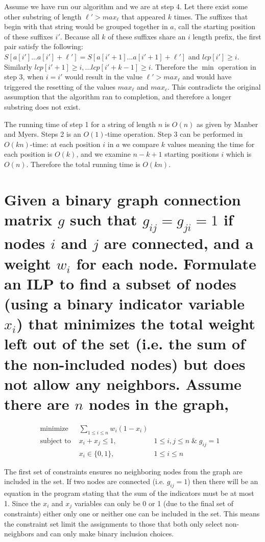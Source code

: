 \documentclass[11pt, oneside]{article}   	%
\begin{document}
Assume we have run our algorithm and we are at step 4. 
Let there exist some other substring of length $\ell'>max_\ell$ that appeared $k$ times.
The suffixes that begin with that string would be grouped together in $a$, call the starting position of these suffixes $i'$. 
Because all $k$ of these suffixes share an $i$ length prefix, the first pair satisfy the following: $S[a[i']...a[i']+\ell'] = S[a[i'+1]...a[i'+1]+\ell']$ and $lcp[i']\ge i$. 
Similarly $lcp[i'+1]\ge i, ... lcp[i'+k-1]\ge i$. 
Therefore the $\min$ operation in step 3, when $i=i'$ would result in the value $\ell' > max_\ell$ and would have triggered the resetting of the values $max_\ell$ and $max_c$. 
This contradicts the original assumption that the algorithm ran to completion, and therefore a longer substring does not exist. 

The running time of step 1 for a string of length $n$ is $O(n)$ as given by Manber and Myers. 
Steps 2 is an $O(1)$-time operation. 
Step 3 can be performed in $O(kn)$-time: at each position $i$ in $a$ we compare $k$ values meaning the time for each position is $O(k)$, and we examine $n-k+1$ starting positions $i$ which is $O(n)$.
Therefore the total running time is $O(kn)$.


\section{Given a binary graph connection matrix $g$ such that $g_{ij} = g_{ji} = 1$ if nodes $i$ and $j$ are connected, and a weight $w_{i}$ for each node. 
Formulate an ILP to find a subset of nodes (using a binary indicator variable $x_i$) that minimizes the total weight left out of the set (i.e. the sum of the non-included nodes) but does not allow any neighbors. 
Assume there are $n$ nodes in the graph,}

\begin{equation}
\begin{array}{rlclcl}
\text{minimize}  & \displaystyle \sum_{1\leq i \leq n} w_i (1 - x_i)  &&\\
\text{subject to }& x_i + x_j \le 1,  & 1 \le i,j \le n \;\&\; g_{ij} = 1\\
			& x_{i} \in \{0,1\},&1 \le i \le n
\end{array}
\end{equation}

The first set of constraints ensures no neighboring nodes from the graph are included in the set. 
If two nodes are connected (i.e. $g_{ij} = 1$) then there will be an equation in the program stating that the sum of the indicators must be at most 1. 
Since the $x_i$ and $x_j$ variables can only be 0 or 1 (due to the final set of constraints) either only one or neither one can be included in the set. 
This means the constraint set limit the assignments to those that both only select non-neighbors and can only make binary inclusion choices. 
\end{document}
